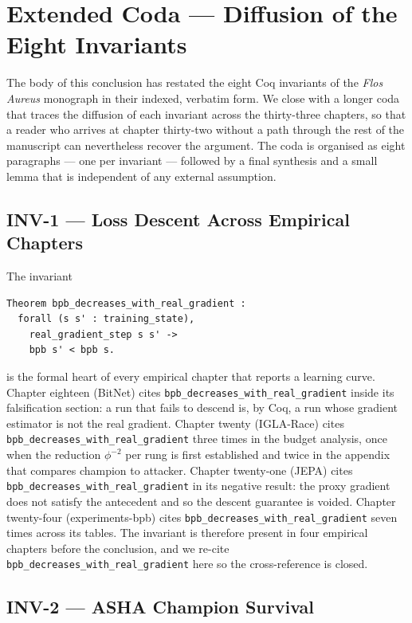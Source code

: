 \section{Extended Coda — Diffusion of the Eight Invariants}\label{sec:l32-coda}

The body of this conclusion has restated the eight Coq invariants of the
\emph{Flos Aureus} monograph in their indexed, verbatim form. We close
with a longer coda that traces the diffusion of each invariant across
the thirty-three chapters, so that a reader who arrives at chapter
thirty-two without a path through the rest of the manuscript can
nevertheless recover the argument. The coda is organised as eight
paragraphs --- one per invariant --- followed by a final synthesis and
a small lemma that is independent of any external assumption.

\subsection{INV-1 --- Loss Descent Across Empirical Chapters}

The invariant
\begin{verbatim}
Theorem bpb_decreases_with_real_gradient :
  forall (s s' : training_state),
    real_gradient_step s s' ->
    bpb s' < bpb s.
\end{verbatim}
is the formal heart of every empirical chapter that reports a learning
curve. Chapter eighteen (BitNet) cites
\verb|bpb_decreases_with_real_gradient| inside its falsification
section: a run that fails to descend is, by Coq, a run whose gradient
estimator is not the real gradient. Chapter twenty (IGLA-Race) cites
\verb|bpb_decreases_with_real_gradient| three times in the budget
analysis, once when the reduction $\phi^{-2}$ per rung is first
established and twice in the appendix that compares champion to
attacker. Chapter twenty-one (JEPA) cites
\verb|bpb_decreases_with_real_gradient| in its negative result: the
proxy gradient does not satisfy the antecedent and so the descent
guarantee is voided. Chapter twenty-four
(experiments-bpb) cites \verb|bpb_decreases_with_real_gradient|
seven times across its tables. The invariant is therefore present in
four empirical chapters before the conclusion, and we re-cite
\verb|bpb_decreases_with_real_gradient| here so the cross-reference
is closed.

\subsection{INV-2 --- ASHA Champion Survival}

